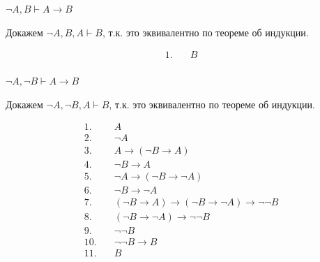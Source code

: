 \begin{exercise}[3.f]
    \(\neg A, B \vdash A \to B\)

    Докажем \(\neg A, B, A \vdash B\), т.к. это эквивалентно по теореме об индукции.

    \begin{align*}
        1.\quad & B \tag{\(\in \Gamma\)} \\
    \end{align*}
\end{exercise}

\begin{exercise}[3.g]
    \(\neg A, \neg B \vdash A \to B\)

    Докажем \(\neg A, \neg B, A \vdash B\), т.к. это эквивалентно по теореме об индукции.

    \begin{align*}
        1.\quad  & A \tag{\(\in \Gamma\)}                                            \\
        2.\quad  & \neg A \tag{\(\in \Gamma\)}                                       \\
        3.\quad  & A \to (\neg B \to A) \tag{a. 1}                                   \\
        4.\quad  & \neg B \to A \tag{M.P. 1, 3}                                      \\
        5.\quad  & \neg A \to (\neg B \to \neg A) \tag{a. 1}                         \\
        6.\quad  & \neg B \to \neg A \tag{M.P. 2, 5}                                 \\
        7.\quad  & (\neg B \to A) \to (\neg B \to \neg A) \to \neg \neg B \tag{а. 9} \\
        8.\quad  & (\neg B \to \neg A) \to \neg \neg B \tag{M.P. 4, 7}               \\
        9.\quad  & \neg \neg B \tag{M.P. 6, 8}                                       \\
        10.\quad & \neg \neg B \to B \tag{a. 10}                                     \\
        11.\quad & B \tag{M.P. 9, 10}                                                \\
    \end{align*}
\end{exercise}


